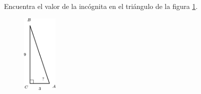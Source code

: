 Encuentra el valor de la incógnita en el triángulo de la figura \ref{fig:angle_functrig_29}.
\begin{figure}[H]
    \begin{center}
        \includegraphics[width=0.15\textwidth]{../images/angle_functrig_29.png}
    \end{center}
    \caption{}
    \label{fig:angle_functrig_29}
\end{figure}